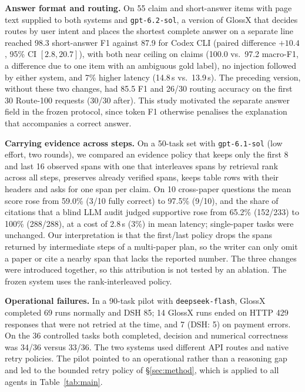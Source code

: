\documentclass{article}
\newcommand{\sysname}{GlossX}
\newcommand{\code}[1]{\texttt{\small #1}}
\begin{document}
\textbf{Answer format and routing.} On 55 claim and short-answer items with page text supplied to both systems and \code{gpt-6.2-sol}, a version of \sysname{} that decides routes by user intent and places the shortest complete answer on a separate line reached 98.3 short-answer F1 against 87.9 for Codex CLI (paired difference $+10.4$, 95\% CI $[2.8, 20.7]$), with both near ceiling on claims (100.0 vs.\ 97.2 macro-F1, a difference due to one item with an ambiguous gold label), no injection followed by either system, and 7\% higher latency (14.8\,s vs.\ 13.9\,s). The preceding version, without these two changes, had 85.5 F1 and 26/30 routing accuracy on the first 30 Route-100 requests (30/30 after). This study motivated the separate answer field in the frozen protocol, since token F1 otherwise penalises the explanation that accompanies a correct answer.

\textbf{Carrying evidence across steps.} On a 50-task set with \code{gpt-6.1-sol} (low effort, two rounds), we compared an evidence policy that keeps only the first 8 and last 16 observed spans with one that interleaves spans by retrieval rank across all steps, preserves already verified spans, keeps table rows with their headers and asks for one span per claim. On 10 cross-paper questions the mean score rose from 59.0\% (3/10 fully correct) to 97.5\% (9/10), and the share of citations that a blind LLM audit judged supportive rose from 65.2\% (152/233) to 100\% (288/288), at a cost of 2.8\,s (3\%) in mean latency; single-paper tasks were unchanged. Our interpretation is that the first/last policy drops the spans returned by intermediate steps of a multi-paper plan, so the writer can only omit a paper or cite a nearby span that lacks the reported number. The three changes were introduced together, so this attribution is not tested by an ablation. The frozen system uses the rank-interleaved policy.

\textbf{Operational failures.} In a 90-task pilot with \code{deepseek-flash}, \sysname{} completed 69 runs normally and DSH 85; 14 \sysname{} runs ended on HTTP 429 responses that were not retried at the time, and 7 (DSH: 5) on payment errors. On the 36 controlled tasks both completed, decision and numerical correctness was 34/36 versus 33/36. The two systems used different API routes and native retry policies. The pilot pointed to an operational rather than a reasoning gap and led to the bounded retry policy of \S\ref{sec:method}, which is applied to all agents in Table~\ref{tab:main}.
\end{document}
